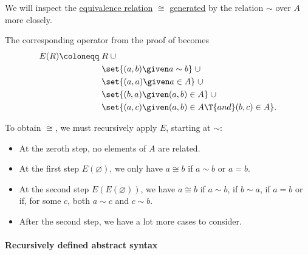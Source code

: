 \begin{example}\label{ex:thm:generated_equivalence_relation}
  We will inspect the \hyperref[def:equivalence_relation]{equivalence relation} \( {\cong} \) \hyperref[thm:generated_equivalence_relation]{generated} by the relation \( {\sim} \) over \( A \) more closely.

  The corresponding operator from the proof of  becomes
  \begin{equation*}
    \begin{aligned}
      E(R) \coloneqq \thickspace & R \thickspace {\cup} \\
                                 & \set{ (a, b) \given a \sim b } \thickspace {\cup} \\
                                 & \set{ (a, a) \given a \in A } \thickspace {\cup} \\
                                 & \set{ (b, a) \given (a, b) \in A } \thickspace {\cup} \\
                                 & \set{ (a, c) \given (a, b) \in A \T{and} (b, c) \in A }.
    \end{aligned}
  \end{equation*}

  To obtain \( {\cong} \), we must recursively apply \( E \), starting at \( {\sim} \):
  \begin{itemize}
    \item At the zeroth step, no elements of \( A \) are related.
    \item At the first step \( E(\varnothing) \), we only have \( a \cong b \) if \( a \sim b \) or \( a = b \).
    \item At the second step \( E(E(\varnothing)) \), we have \( a \cong b \) if \( a \sim b \), if \( b \sim a \), if \( a = b \) or if, for some \( c \), both \( a \sim c \) and \( c \sim b \).
    \item After the second step, we have a lot more cases to consider.
  \end{itemize}
\end{example}

\paragraph{Recursively defined abstract syntax}

